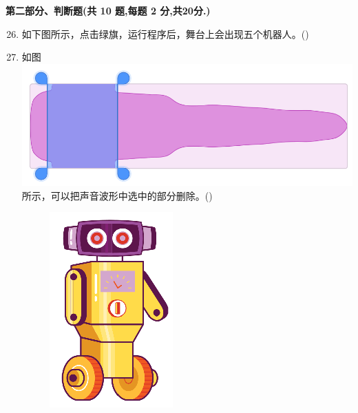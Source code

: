 \documentclass[10pt, a4paper]{article}
\newcommand{\hq}{\hfill(\qquad)}
\begin{document}
    {\noindent\textbf{第二部分、判断题(共 10 题,每题 2 分,共20分.)}}
    \begin{enumerate}
        \setcounter{enumi}{25}
        \item 如下图所示，点击绿旗，运行程序后，舞台上会出现五个机器人。\hq

        \item 如图\includegraphics[width=.15\textwidth]{figure/27.png}所示，可以把声音波形中选中的部分删除。\hq
        
        \begin{figure}[htbp]
            \centering
            \begin{minipage}[t]{.2\textwidth}
                \centering
                \begin{minipage}[t]{.5\textwidth}
                    \centering
                    \includegraphics[width=\textwidth]{figure/26-1.png}

\end{minipage}
\end{minipage}
\end{figure}
\end{enumerate}
\end{document}
